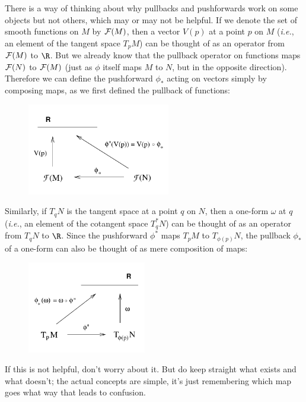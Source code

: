 \documentclass[12pt]{article}
\begin{document}
There is a way of thinking about why pullbacks and pushforwards work
on some objects but not others, which may or may not be helpful.
If we denote the set of smooth functions on $M$ by ${\cal F}(M)$,
then a vector $V(p)$ at a point $p$ on $M$ ({\it i.e.}, an element of 
the tangent space $T_pM$) can be thought of as an operator from 
${\cal F}(M)$ to $\R$.  But we already know that the pullback operator
on functions maps ${\cal F}(N)$ to ${\cal F}(M)$ (just as $\phi$
itself maps $M$ to $N$, but in the opposite direction).  Therefore
we can define the pushforward $\phi_*$ acting on vectors simply by
composing maps, as we first defined the pullback of functions:

\begin{figure}[h]
  \centerline{
  \includegraphics[height=4cm]{pdf/five2}}
\end{figure}

\noindent Similarly, if $T_qN$ is the tangent space at a point $q$ on $N$,
then a one-form $\omega$ at $q$ 
({\it i.e.}, an element of the cotangent space $T_q^*N$) can be thought of 
as an operator from $T_qN$ to $\R$.  Since the pushforward
$\phi^*$ maps $T_pM$ to $T_{\phi(p)}N$, the pullback $\phi_*$
of a one-form can also be thought of as mere composition of maps:

\begin{figure}[h]
  \centerline{
  \includegraphics[height=4cm]{pdf/five3}}
\end{figure}

\noindent If this is not helpful, don't worry about it.  But do keep
straight what exists and what doesn't; the actual concepts are simple,
it's just remembering which map goes what way that leads to confusion.
\end{document}
